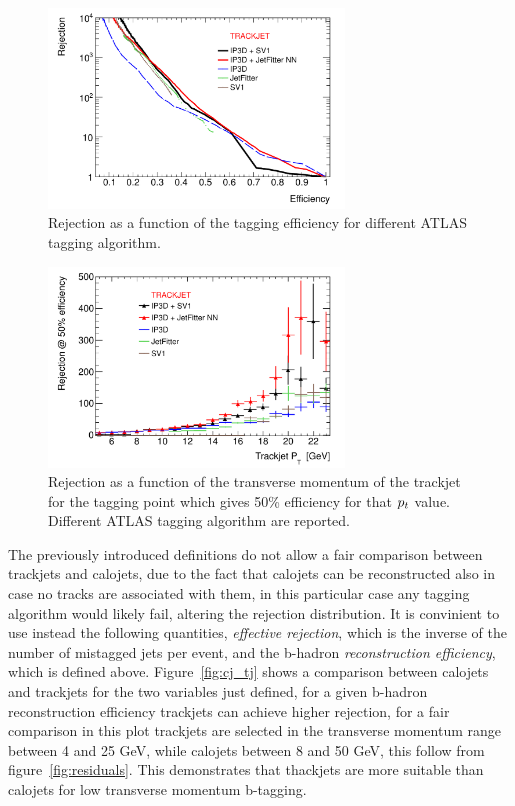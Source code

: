 \begin{figure}[tp]
\centering
\includegraphics[width=0.7\textwidth]{figure/trackjet/std_eff_rej.pdf}
\caption{Rejection as a function of the tagging efficiency for different ATLAS tagging algorithm.}
\label{fig:eff_rej}
\end{figure}    

\begin{figure}[tp]
\centering
\includegraphics[width=0.7\textwidth]{figure/trackjet/std_rej_pt.pdf}
\caption{Rejection as a function of the transverse momentum of the trackjet for the
	tagging point which gives 50\% efficiency for that $p_{t}$ value. Different ATLAS tagging algorithm 
	are reported.}
\label{fig:rej_pt}
\end{figure}    

The previously introduced definitions do not allow a fair comparison between trackjets 
and calojets, due to the fact that calojets can be reconstructed also in case
no tracks are associated with them, in this particular case any tagging algorithm would likely fail,
altering the rejection distribution. It is convinient to use instead the following quantities,
\emph{effective rejection}, which is the inverse of the number of mistagged jets per event, and the
b-hadron \emph{reconstruction efficiency}, which is defined above. Figure~\ref{fig:cj_tj} shows 
a comparison between calojets and trackjets for the two variables just defined, for a given 
b-hadron reconstruction efficiency  trackjets can achieve higher rejection, for a fair 
comparison in this plot trackjets are selected in the transverse momentum range between 4 and 25 GeV, while
calojets between 8 and 50 GeV, this follow from figure~\ref{fig:residuals}. This demonstrates that 
thackjets are more suitable than calojets for low transverse momentum b-tagging.

